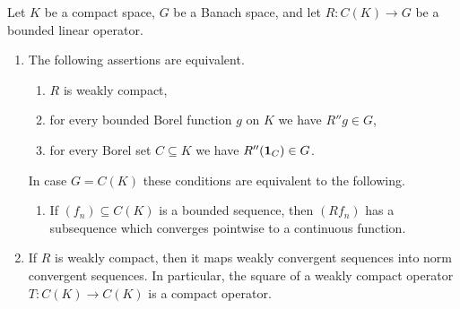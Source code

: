 \begin{proposition}\label{prop:b4-2.4}
	Let $K$ be a compact space, $G$ be a Banach space, and let $R \colon C(K) \to G$ be a bounded linear operator.
	
\begin{enumerate}[\upshape (i)]
    \item
    The following assertions are equivalent.
    \begin{enumerate}[\upshape (a)]
    \item 
    $R$ is weakly compact,

    \item 
    for every bounded Borel function $g$ on $K$ we have $R''g \in G$,

    \item 
    for every Borel set $C \subseteq K$ we have $R''(\mathbf{1}_C) \in G$.
\end{enumerate}
In case $G = C(K)$ these conditions are equivalent to the following.
	\begin{enumerate}
	\item 
	If\/ $(f_n) \subseteq C(K)$ is a bounded sequence, then $(Rf_n)$ has a subsequence which converges pointwise to a continuous function.
    \end{enumerate}
	
\item 
If\/ $R$ is weakly compact, then it maps weakly convergent sequences into norm convergent sequences.
In particular, the square of a weakly
compact operator $T \colon C(K) \to C(K)$ is a compact operator.
\end{enumerate}
\end{proposition}
